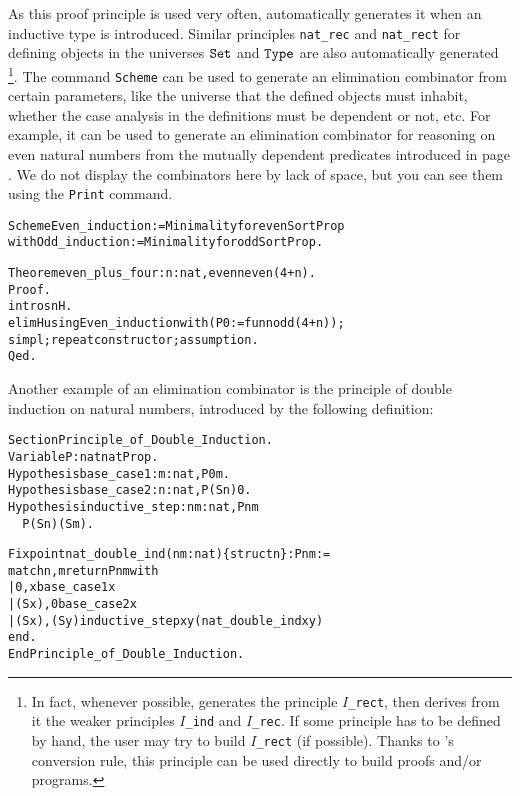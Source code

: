 \documentclass[11pt]{article}
\newcommand{\refmancite}[1]{{}}
\begin{document}
As this proof principle is used very often, {\coq} automatically generates it
when an inductive type is introduced.  Similar principles
\texttt{nat\_rec} and \texttt{nat\_rect} for defining objects in the
universes $\texttt{Set}$ and $\texttt{Type}$ are also automatically generated
\footnote{In fact, whenever possible, {\coq} generates the
principle \texttt{$I$\_rect}, then derives from it the
weaker principles  \texttt{$I$\_ind} and \texttt{$I$\_rec}.
If some principle has to be defined by hand, the user may try
to build \texttt{$I$\_rect} (if possible). Thanks to {\coq}'s conversion
rule, this principle can be used directly to build proofs and/or
programs.}. The
command \texttt{Scheme} \refmancite{Section \ref{Scheme}} can be
used to generate an elimination combinator from certain parameters,
like the universe that the defined objects must inhabit, whether the
case analysis in the definitions must be dependent or not, etc. For
example, it can be used to generate an elimination combinator for
reasoning on even natural numbers from the mutually dependent
predicates introduced in page \pageref{Even}. We do not display the
combinators here by lack of space, but you can see them using the
\texttt{Print} command.

\begin{alltt}
Scheme Even_induction := Minimality for even Sort Prop
with   Odd_induction  := Minimality for odd  Sort Prop.
\end{alltt}

\begin{alltt}
Theorem even_plus_four : {\prodsym} n:nat, even n {\arrow} even (4+n).
Proof.
 intros n H.
 elim H using Even_induction with (P0 := fun n {\funarrow} odd (4+n));
 simpl;repeat constructor;assumption.
Qed.
\end{alltt}

Another example of an elimination combinator is the principle 
of double induction on natural numbers, introduced by the following
definition:

\begin{alltt}
Section Principle_of_Double_Induction.
Variable    P              : nat {\arrow} nat {\arrow}Prop.
Hypothesis  base_case1     : {\prodsym} m:nat, P 0 m.
Hypothesis  base_case2     : {\prodsym} n:nat, P (S n) 0.
Hypothesis  inductive_step : {\prodsym} n m:nat, P n m {\arrow}
                                       \,\, P (S n) (S m).

Fixpoint nat_double_ind (n m:nat)\{struct n\} : P n m := 
 match n, m return P n m with 
 |     0 ,    x   {\funarrow}  base_case1 x 
 |  (S x),    0   {\funarrow} base_case2 x
 |  (S x), (S y) {\funarrow} inductive_step x y (nat_double_ind x y)
 end.
End Principle_of_Double_Induction.
\end{alltt}
\end{document}
